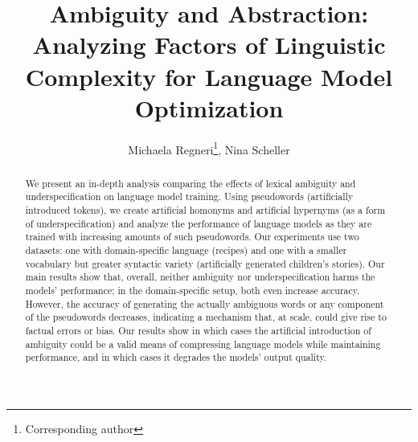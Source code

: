 \documentclass[final]{clv2025}
\begin{document}
\title{Ambiguity and Abstraction: Analyzing Factors of Linguistic Complexity for Language Model Optimization}

%
\author{Michaela Regneri\thanks{Corresponding author}, Nina Scheller}





\maketitle

\begin{abstract}
We present an in-depth analysis comparing the effects of lexical ambiguity and underspecification on language model training. Using pseudowords (artificially introduced tokens), we create artificial homonyms and artificial hypernyms (as a form of underspecification) and analyze the performance of language models as they are trained with increasing amounts of such pseudowords. Our experiments use two datasets: one with domain-specific language (recipes) and one with a smaller vocabulary but greater syntactic variety (artificially generated children's stories). Our main results show that, overall, neither ambiguity nor underspecification harms the models' performance; in the domain-specific setup, both even increase accuracy. However, the accuracy of generating the actually ambiguous words or any component of the pseudowords decreases, indicating a mechanism that, at scale, could give rise to factual errors or bias. Our results show in which cases the artificial introduction of ambiguity could be a valid means of compressing language models while maintaining performance, and in which cases it degrades the models' output quality.
\end{abstract}
\end{document}
